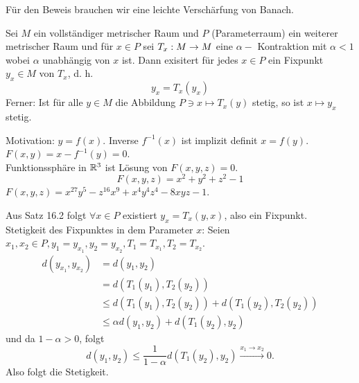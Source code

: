 \documentclass[../ana2.tex]{subfiles}
\begin{document}
Für den Beweis brauchen wir eine leichte Verschärfung von
Banach.
\begin{lem}
    Sei \( M \) ein vollständiger metrischer Raum und \( P \) 
    (Parameterraum) ein weiterer metrischer Raum und für \( x\in P \)     
    sei \(T_x:M\rightarrow M\) eine \(\alpha-\) Kontraktion mit \(\alpha < 1\)
    wobei \(\alpha\) unabhängig von \(x\) ist. Dann exisitert für jedes \(x \in P\)
    ein Fixpunkt \(y_x \in M\) von \(T_x\), d. h. 
    \[ y_x = T_x(y_x) \]
    Ferner: Ist für alle \(y \in M\) die Abbildung 
    \(P \ni x \mapsto T_x(y)\) stetig, so ist
    \( x \mapsto y_x \) stetig.
\end{lem}
Motivation:
\( y = f(x) \). Inverse \( f^{-1}(x) \) ist implizit definit 
\( x = f(y) \). \( F(x,y) = x - f^{-1}(y) = 0 \).\\
Funktionssphäre in \( \mathbb{R}^3 \) ist Lösung von 
\( F(x,y,z) = 0 \).
\[ F(x,y,z) = x^2 + y^2 + z^2 - 1 \]
\( F(x,y,z) = x^{27}y^5 - z^{16}x^9 + x^4 y^4 z^4 - 8xyz - 1 \).
\begin{bew}
    Aus Satz 16.2 folgt \( \forall x \in P \) 
    existiert \( y_x = T_x(y,x) \), also ein Fixpunkt.\\
    Stetigkeit des Fixpunktes in dem Parameter \( x \): 
    Seien \( x_1, x_2 \in P, y_1 = y_{x_1}, y_2 = y_{x_2}, 
    T_1 = T_{x_1}, T_2 = T_{x_2} \).
    \begin{align*}
        d(y_{x_1}, y_{x_2}) &= d(y_1, y_2) \\
        &= d(T_1(y_1), T_2(y_2)) \\
        &\leq d(T_1(y_1), T_2(y_2)) + d(T_1(y_2), T_2(y_2)) \\
        &\leq \alpha d(y_1, y_2) + d(T_1(y_2), y_2)
    \end{align*}
    und da \( 1-\alpha > 0 \), folgt 
    \[ d(y_1, y_2) \leq \frac{1}{1-\alpha} d(T_1(y_2),y_2) 
    \overset{x_1 \rightarrow x_2}{\longrightarrow} 0. \]
    Also folgt die Stetigkeit.
\end{bew}
\end{document}
